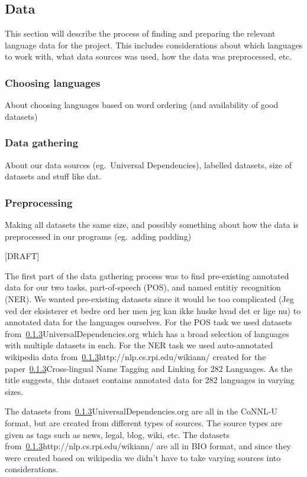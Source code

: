 

\subsection{Data}

This section will describe the process of finding and preparing the relevant
language data for the project. This includes considerations about which
languages to work with, what data sources was used, how the data was
preprocessed, etc.


\subsubsection{Choosing languages}

About choosing languages based on word ordering (and availability of good
datasets)


\subsubsection{Data gathering}

About our data sources (eg.\ Universal Dependencies), labelled datasets, size of
datasets and stuff like dat.


\subsubsection{Preprocessing}

Making all datasets the same size, and possibly something about how the data is
preprocessed in our programs (eg.\ adding padding)


[DRAFT]

The first part of the data gathering process was to find pre-existing annotated data for our two tasks, part-of-speech (POS), and named entitiy recognition (NER).
We wanted pre-existing datasets since it would be {too complicated (Jeg ved der eksisterer et bedre ord her men jeg kan ikke huske hvad det er lige nu)} to annotated data for the languages ourselves.
For the POS task we used datasets from~\ref{}{UniversalDependencies.org} which has a broad selection of languages with multiple datasets in each.
For the NER task we used auto-annotated wikipedia data from~\ref{}{http://nlp.cs.rpi.edu/wikiann/} created for the paper~\ref{}{Cross-lingual Name Tagging and Linking for 282 Languages}.
As the title suggests, this dataset contains annotated data for 282 languages in varying sizes.

The datasets from~\ref{}{UniversalDependencies.org} are all in the CoNNL-U format, but are created from different types of sources. 
The source types are given as tags such as news, legal, blog, wiki, etc.
The datasets from~\ref{}{http://nlp.cs.rpi.edu/wikiann/} are all in BIO format, and since they were created based on wikipedia we didn't have to take varying sources into considerations.

